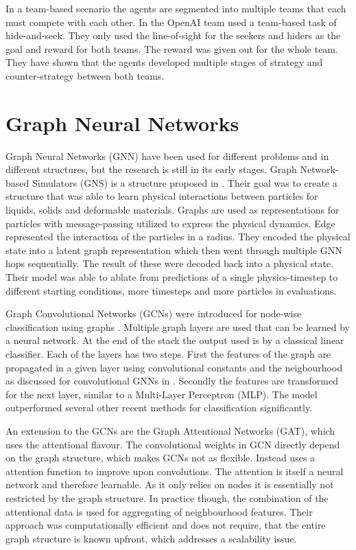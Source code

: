 In a team-based scenario the agents are segmented into multiple teams that each must compete with each other. In \citet{Teams2019} the OpenAI team used a team-based task of hide-and-seek. They only used the line-of-sight for the seekers and hiders as the goal and reward for both teams. The reward was given out for the whole team. They have shown that the agents developed multiple stages of strategy and counter-strategy between both teams.




\section{Graph Neural Networks}
Graph Neural Networks (GNN) have been used for different problems and in different structures, but the research is still in its early stages. Graph Network-based Simulators (GNS) is a structure proposed in \citet{GNS2020}. Their goal was to create a structure that was able to learn physical interactions between particles for liquids, solids and deformable materials. Graphs are used as representations for particles with message-passing utilized to express the physical dynamics. Edge represented the interaction of the particles in a radius. They encoded the physical state into a latent graph representation which then went through multiple GNN hops sequentially. The result of these were decoded back into a physical state. Their model was able to ablate from predictions of a single physics-timestep to different starting conditions, more timesteps and more particles in evaluations. \par

Graph Convolutional Networks (GCNs) were introduced for node-wise classification using graphs \citep{SGCN2019}. Multiple graph layers are used that can be learned by a neural network. At the end of the stack the output used is by a classical linear classifier. Each of the layers has two steps. First the features of the graph are propagated in a given layer using convolutional constants and the neigbourhood as discussed for convolutional GNNs in . Secondly the features are transformed for the next layer, similar to a Multi-Layer Perceptron (MLP). The model outperformed several other recent methods for classification significantly. \par

An extension to the GCNs are the Graph Attentional Networks (GAT), which uses the attentional flavour. The convolutional weights in GCN directly depend on the graph structure, which makes GCNs not as flexible. Instead \citet{GAT2017} uses a attention function to improve upon convolutions. The attention is itself a neural network and therefore learnable. As it only relies on nodes it is essentially not restricted by the graph structure. In practice though, the combination of the attentional data is used for aggregating of neighbourhood features. Their approach was computationally efficient and does not require, that the entire graph structure is known upfront, which addresses a scalability issue. \par

